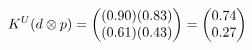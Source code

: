 \documentclass[preview]{standalone}
\begin{document}
\begin{align*}
\special{dvisvgm:raw <g id='unique000'>}K^U(d \otimes p) = \begin{pmatrix} (0.90)(0.83) \\ (0.61)(0.43) \end{pmatrix} = \begin{pmatrix} 0.74 \\ 0.27 \end{pmatrix}\special{dvisvgm:raw </g>}
\end{align*}
\end{document}
